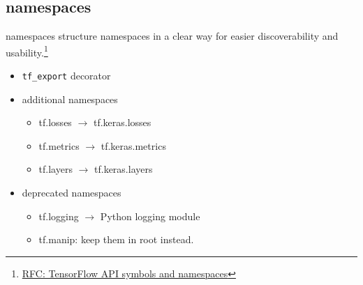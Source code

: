 
\subsection{namespaces}

\begin{frame}{namespaces}
    structure namespaces in a clear way for easier discoverability and usability.\footnote{\href{https://github.com/tensorflow/community/pull/16}{RFC: TensorFlow API symbols and namespaces}}

    \begin{itemize}
        \item \lstinline{tf_export} decorator
        \item additional namespaces
            \begin{itemize}
                \item tf.losses $\to$ tf.keras.losses
                \item tf.metrics $\to$ tf.keras.metrics
                \item tf.layers $\to$ tf.keras.layers
            \end{itemize}
        \item deprecated namespaces
            \begin{itemize}
                \item tf.logging $\to$ Python logging module
                \item tf.manip: keep them in root instead.
            \end{itemize}
    \end{itemize}
\end{frame}
